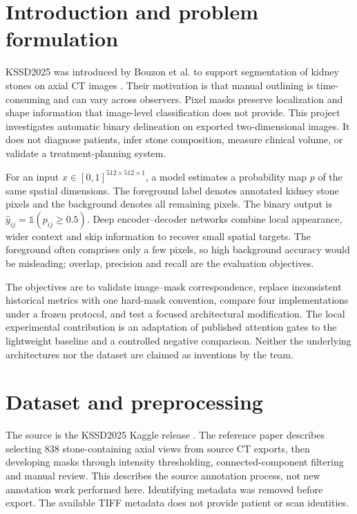\documentclass[a4paper,fleqn]{cas-sc}
\begin{document}
\section{Introduction and problem formulation}
KSSD2025 was introduced by Bouzon et al. to support segmentation of kidney stones on axial CT images \cite{bouzon2025}. Their motivation is that manual outlining is time-consuming and can vary across observers. Pixel masks preserve localization and shape information that image-level classification does not provide. This project investigates automatic binary delineation on exported two-dimensional images. It does not diagnose patients, infer stone composition, measure clinical volume, or validate a treatment-planning system.

For an input $x\in[0,1]^{512\times512\times1}$, a model estimates a probability map $p$ of the same spatial dimensions. The foreground label denotes annotated kidney stone pixels and the background denotes all remaining pixels. The binary output is $\hat y_{ij}=\mathbb{1}(p_{ij}\ge0.5)$. Deep encoder--decoder networks combine local appearance, wider context and skip information to recover small spatial targets. The foreground often comprises only a few pixels, so high background accuracy would be misleading; overlap, precision and recall are the evaluation objectives.

The objectives are to validate image--mask correspondence, replace inconsistent historical metrics with one hard-mask convention, compare four implementations under a frozen protocol, and test a focused architectural modification. The local experimental contribution is an adaptation of published attention gates to the lightweight baseline and a controlled negative comparison. Neither the underlying architectures nor the dataset are claimed as inventions by the team.

\section{Dataset and preprocessing}
\label{sec:data}
The source is the KSSD2025 Kaggle release \cite{kssddata,bouzon2025}. The reference paper describes selecting 838 stone-containing axial views from source CT exports, then developing masks through intensity thresholding, connected-component filtering and manual review. This describes the source annotation process, not new annotation work performed here. Identifying metadata was removed before export. The available TIFF metadata does not provide patient or scan identities.
\end{document}
